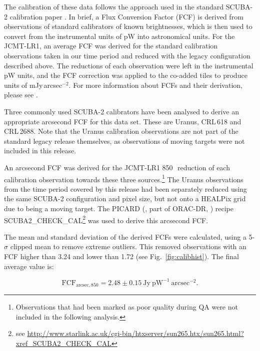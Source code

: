 \documentclass[twocolumn,times]{aastex6}
\newcommand{\ascl}[1]{\href{http://www.ascl.net/#1}{ascl:#1}}
\begin{document}
The calibration of these data follows the approach used in the
standard SCUBA-2 calibration paper \citep{Dempsey2013}. In brief, a
Flux Conversion Factor (FCF) is derived from observations of standard
calibrators of known brightnesses, which is then used to convert from
the instrumental units of pW into astronomical units. For the
JCMT-LR1, an average FCF was derived for the standard calibration
observations taken in our time period and reduced with the legacy
configuration described above.  The reductions of each observation
were left in the instrumental pW units, and the FCF correction was
applied to the co-added tiles to produce units of
mJy\,arcsec$^{-2}$. For more information about FCFs and their
derivation, please see \citet{Dempsey2013}.

Three commonly used SCUBA-2 calibrators have been analysed to derive
an appropriate arcsecond FCF for this data set. These are Uranus,
CRL\,618 and CRL\,2688. Note that the Uranus calibration observations
are not part of the standard legacy release themselves, as
observations of moving targets were not included in this release.

An arcsecond FCF was derived for the JCMT-LR1 850\,\micron\ reduction
of each calibration observation towards these three
sources.\footnote{Observations that had been marked as poor quality
  during QA were not included in the following analysis.}  The Uranus
observations from the time period covered by this release had been
separately reduced using the same SCUBA-2 configuration and pixel
size, but not onto a HEALPix grid due to being a moving target. The
PICARD (\citealp{SUN265}, part of ORAC-DR, \citealp[][\ascl{1310.001}]{SUN230})
recipe SCUBA2\_CHECK\_CAL\footnote{see
  \url{http://www.starlink.ac.uk/cgi-bin/htxserver/sun265.htx/sun265.html?xref_SCUBA2_CHECK_CAL}}
was used to derive this arcsecond FCF.

The mean and standard deviation of the derived FCFs were calculated,
using a 5-$\sigma$ clipped mean to remove extreme outliers. This removed
observations with an FCF higher than 3.24 and lower than 1.72 (see
Fig.~\ref{fig:calibhist}). The final average value is:

\begin{equation}
\mathrm{FCF}_{\mathrm{arcsec},850} = 2.48 \pm 0.15\ \mathrm{Jy}\ \mathrm{pW}^{-1}\  \mathrm{arcsec}^{-2}.
\end{equation}
\end{document}
